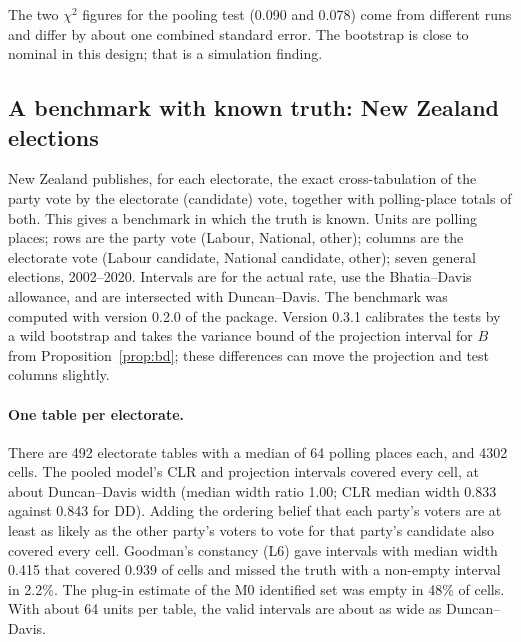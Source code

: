 The two $\chi^2$ figures for the pooling test (0.090 and 0.078) come from different
runs and differ by about one combined standard error. The bootstrap is close to
nominal in this design; that is a simulation finding.

\subsection{A benchmark with known truth: New Zealand elections}

New Zealand publishes, for each electorate, the exact cross-tabulation of the party
vote by the electorate (candidate) vote, together with polling-place totals of both.
This gives a benchmark in which the truth is known. Units are polling places; rows
are the party vote (Labour, National, other); columns are the electorate vote
(Labour candidate, National candidate, other); seven general elections, 2002--2020.
Intervals are for the actual rate, use the Bhatia--Davis allowance, and are
intersected with Duncan--Davis. The benchmark was computed with version 0.2.0 of the
package. Version 0.3.1 calibrates the tests by a wild bootstrap and takes the variance
bound of the projection interval for $B$ from Proposition~\ref{prop:bd}; these
differences can move the projection and test columns slightly.

\paragraph{One table per electorate.} There are 492 electorate tables with a median
of 64 polling places each, and 4302 cells. The pooled model's CLR and projection
intervals covered every cell, at about Duncan--Davis width (median width ratio
1.00; CLR median width 0.833 against 0.843 for DD). Adding the ordering belief that
each party's voters are at least as likely as the other party's voters to vote for
that party's candidate also covered every cell. Goodman's constancy (L6) gave
intervals with median width 0.415 that covered 0.939 of cells and missed the truth
with a non-empty interval in 2.2\%. The plug-in estimate of the M0 identified set was
empty in 48\% of cells. With about 64 units per table, the valid intervals are about
as wide as Duncan--Davis.

